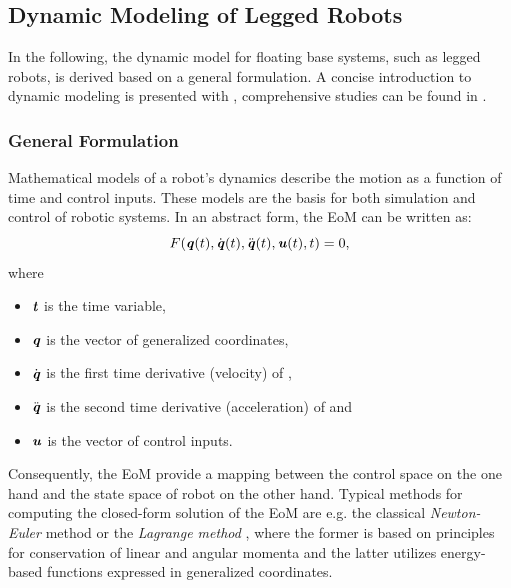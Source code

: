 \subsection{Dynamic Modeling of Legged Robots}\label{subsec:DynamicModeling}
In the following, the dynamic model for floating base systems, such as legged robots, is derived based on a general formulation. A concise introduction to dynamic modeling is presented with \cite{scaronTeaching}, comprehensive studies can be found in \cite{pfeiffer1996multibody, jain2010robot, featherstone2014rigid}.
\subsubsection{General Formulation}
Mathematical models of a robot's dynamics describe the motion as a function of time and control inputs. These models are the basis for both simulation and control of robotic systems. In an abstract form, the \gls{EoM} can be written as: 
\begin{equation} \label{eqn:EoMGeneral}
F(\bm{\mathit{q}}(t),\dot{\bm{\mathit{q}}}(t),\ddot{\bm{\mathit{q}}}(t),\bm{\mathit{u}}(t),t)=0,
\end{equation}
where 
\begin{itemize}
\item $\bm{\mathit{t}}$ is the time variable, 
\item $\bm{\mathit{q}}$ is the vector of generalized coordinates,
\item $\dot{\bm{\mathit{q}}}$ is the first time derivative (velocity) of \bq, 
\item $\ddot{\bm{\mathit{q}}}$ is the second time derivative (acceleration) of \bq and
\item $\bm{\mathit{u}}$ is the vector of control inputs. 
\end{itemize}
Consequently, the \gls{EoM} provide a mapping between the control space on the one hand and the state space of robot on the other hand. Typical methods for computing the closed-form solution of the \gls{EoM} are e.g. the classical \textit{Newton-Euler} \cite{luh1980line} method or the \textit{Lagrange method} \cite{hollerbach1980recursive}, where the former is based on principles for conservation of linear and angular momenta and the latter utilizes energy-based functions expressed in generalized coordinates. 
